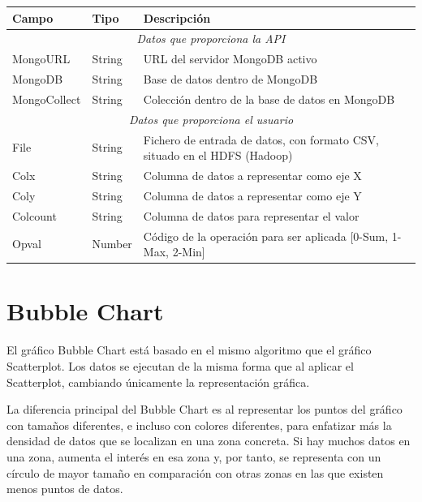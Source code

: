 \begin{tabular}{|l|l|p{7cm}|}
	\hline 
	\textbf{Campo} & \textbf{Tipo} & \textbf{Descripción} \\ 
	\hline \hline
	\multicolumn{3}{|c|}{\textit{Datos que proporciona la API}} \\
	\hline 
	MongoURL & String & URL del servidor MongoDB activo \\ 
	\hline 
	MongoDB & String & Base de datos dentro de MongoDB \\ 
	\hline 
	MongoCollect& String & Colección dentro de la base de datos en MongoDB \\ 
	\hline \hline
	\multicolumn{3}{|c|}{\textit{Datos que proporciona el usuario}} \\
	\hline 
	File & String & Fichero de entrada de datos, con formato CSV, situado en el HDFS (Hadoop) \\ 
	\hline 
	Colx & String & Columna de datos a representar como eje X \\ 
	\hline 
	Coly & String & Columna de datos a representar como eje Y \\ 
	\hline 
	Colcount & String & Columna de datos para representar el valor \\ 
	\hline 
	Opval & Number & Código de la operación para ser aplicada  [0-Sum, 1-Max, 2-Min] \\ 
	\hline 
\end{tabular} 


\section{Bubble Chart}
El gráfico Bubble Chart está basado en el mismo algoritmo que el gráfico Scatterplot. Los datos se ejecutan de la misma forma que al aplicar el Scatterplot, cambiando únicamente la representación gráfica.

La diferencia principal del Bubble Chart es al representar los puntos del gráfico con tamaños diferentes, e incluso con colores diferentes, para enfatizar más la densidad de datos que se localizan en una zona concreta. Si hay muchos datos en una zona, aumenta el interés en esa zona y, por tanto, se representa con un círculo de mayor tamaño en comparación con otras zonas en las que existen menos puntos de datos.

